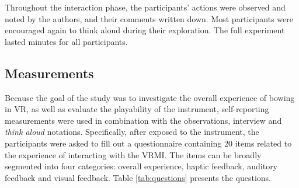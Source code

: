 Throughout the interaction phase, the participants' actions were observed and noted by the authors, and their comments written down. Most participants were encouraged again to think aloud during their exploration. The full experiment lasted  minutes for all participants.
\subsection{Measurements}

Because the  goal of the study was to investigate the overall experience of bowing in VR, as well as evaluate the playability of the instrument,  self-reporting measurements were used in combination with the observations, interview and \textit{think aloud} notations. Specifically, after exposed to the instrument, the participants were asked to fill out a questionnaire containing 20 items related to the experience of interacting with the VRMI. The items can be broadly segmented into four categories: overall experience, haptic feedback, auditory feedback and visual feedback. Table \ref{tab:questions} presents the questions.

